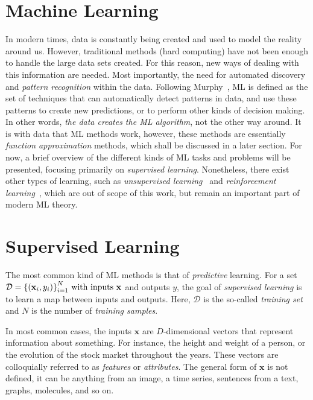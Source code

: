 \section{Machine Learning}
In modern times, data is constantly being created and used to model the reality around us.
However, traditional methods (hard computing) have not been enough to handle the large
data sets created. For this reason, new ways of dealing with this information are needed. 
Most importantly, the need for automated discovery and \emph{pattern recognition} within the
data. Following Murphy~\cite{murphyMachineLearningProbabilistic2012}, ML 
is defined as the set of techniques that can automatically detect patterns in data, and use 
these patterns to create new predictions, or to perform other kinds of decision making.
In other words, \emph{the data creates the ML algorithm}, not the other way around.
It is with data that ML methods work, however, these methods are essentially
\emph{function approximation} methods, which shall be discussed in a later section.
For now, a brief overview of the different kinds of ML tasks and problems will be presented,
focusing primarily on \emph{supervised learning}. Nonetheless, there exist other types
of learning, such as \emph{unsupervised learning}~\cite{goodfellowDeepLearning2016,hastieElementsStatisticalLearning2009} and \emph{reinforcement learning}~\cite{suttonReinforcementLearningSecond2018,kaelblingReinforcementLearningSurvey1996},
which are out of scope of this work, but remain an important part of modern ML theory.

\section{Supervised Learning}
The most common kind of ML methods is that of \emph{predictive} learning. For a set 
\(\mathcal{D}={ \{(\mathbf{x}_{i}, y_i)\} }_{i=1}^{N}$ with inputs $\mathbf{x}\)
and outputs $y$, the goal of \emph{supervised learning} is to learn a map between
inputs and outputs. Here, $\mathcal{D}$ is the so-called \emph{training set} and $N$
is the number of \emph{training samples}.

In most common cases, the inputs $\mathbf{x}$ are $D$-dimensional vectors that
represent information about something. For instance, the height and weight of a
person, or the evolution of the stock market throughout the years. 
These vectors are colloquially referred to as \emph{features} or \emph{attributes}.
The general form of $\mathbf{x}$ is not defined, it can be anything from an image, a time 
series, sentences from a text, graphs, molecules, and so on.


